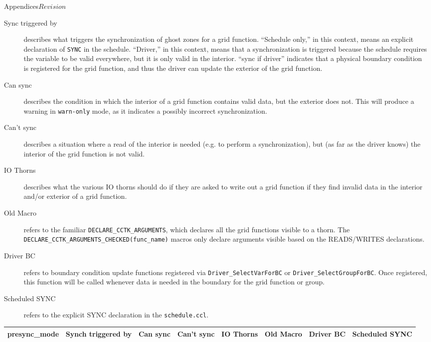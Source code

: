 \begin{cactuspart}{Appendices}{}{$Revision$}
\begin{Lentry}
\begin{description}
\item[Sync triggered by] describes what triggers the synchronization of ghost zones for a grid function. ``Schedule only,'' in this context, means an explicit declaration of \texttt{SYNC} in the schedule. ``Driver,'' in this context, means that a synchronization is triggered because the schedule requires the variable to be valid everywhere, but it is only valid in the interior.
``sync if driver'' indicates that a physical boundary condition is registered for the grid function, and
thus the driver can update the exterior of the grid function.
\item[Can sync] describes the condition in which the interior of a grid function contains valid data, but the exterior does not. This will produce a warning in \texttt{warn-only} mode, as it indicates a possibly incorrect synchronization.
\item[Can't sync] describes a situation where a read of the interior is needed (e.g. to perform a synchronization), but (as far as the driver knows) the interior of the grid function is not valid.
\item[IO Thorns] describes what the various IO thorns should do if they are asked to write out a
grid function if they find invalid data in the interior and/or exterior of a grid function.
\item[Old Macro] refers to the familiar \texttt{DECLARE\_CCTK\_ARGUMENTS}, which declares
all the grid functions visible to a thorn. The \texttt{DECLARE\_CCTK\_ARGUMENTS\_CHECKED(func\_name)} macros
only declare arguments visible based on the READS/WRITES declarations.
\item[Driver BC] refers to boundary condition update functions registered via
\texttt{Driver\_SelectVarForBC} or \texttt{Driver\_SelectGroupForBC}. Once registered, this function
will be called whenever data is needed in the boundary for the grid function or group.
\item[Scheduled SYNC] refers to the explicit SYNC declaration in the \texttt{schedule.ccl}.
\end{description}
\begin{table}[h!]
\scriptsize
\begin{tabular}{|l|l|l|l|l|l|l|l|}
\hline
\textbf{presync\_mode} & \textbf{Synch triggered by} & \textbf{Can sync}                                                   & \textbf{Can't sync} & \textbf{IO Thorns}                                                               & \textbf{Old Macro} & \textbf{Driver BC} & \textbf{Scheduled SYNC} \\ \hline

\end{tabular}
\end{table}
\end{Lentry}
\end{cactuspart}
